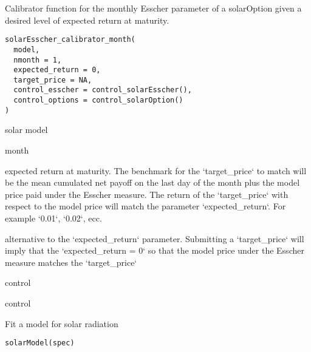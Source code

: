 \documentclass[a4paper]{book}
\begin{document}
%
\begin{Description}\relax
Calibrator function for the monthly Esscher parameter of a solarOption given a
desired level of expected return at maturity.
\end{Description}
%
\begin{Usage}
\begin{verbatim}
solarEsscher_calibrator_month(
  model,
  nmonth = 1,
  expected_return = 0,
  target_price = NA,
  control_esscher = control_solarEsscher(),
  control_options = control_solarOption()
)
\end{verbatim}
\end{Usage}
%
\begin{Arguments}
\begin{ldescription}
\item[\code{model}] solar model

\item[\code{nmonth}] month

\item[\code{expected\_return}] expected return at maturity. The benchmark for the `target\_price` to match will be the
mean cumulated net payoff on the last day of the month plus the model price paid under the Esscher measure.
The return of the `target\_price` with respect to the model price will match the parameter `expected\_return`. For example `0.01`, `0.02`, ecc.

\item[\code{target\_price}] alternative to the `expected\_return` parameter. Submitting a `target\_price` will imply that the `expected\_return = 0` so that
the model price under the Esscher measure matches the `target\_price`

\item[\code{control\_esscher}] control

\item[\code{control\_options}] control
\end{ldescription}
\end{Arguments}
%
\begin{Description}\relax
Fit a model for solar radiation
\end{Description}
%
\begin{Usage}
\begin{verbatim}
solarModel(spec)
\end{verbatim}
\end{Usage}
\end{document}
